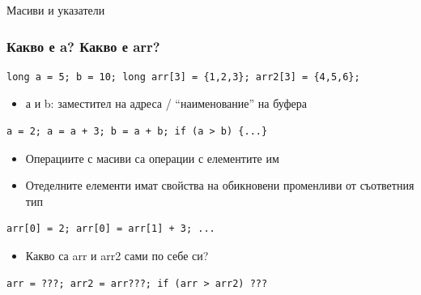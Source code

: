 \documentclass{beamer}
\begin{document}
\begin{frame}
\centerline{Масиви и указатели}
\end{frame}


\begin{frame}[fragile]
\frametitle{Какво е a? Какво е arr?}

\begin{flushleft}
\begin{lstlisting}
long a = 5; b = 10; long arr[3] = {1,2,3}; arr2[3] = {4,5,6};
\end{lstlisting}
\end{flushleft}

\pause

\begin{itemize}
  \item а  и  b: заместител на адреса / ``наименование'' на буфера
\end{itemize}

\begin{flushleft}
\begin{lstlisting}
a = 2; a = a + 3; b = a + b; if (a > b) {...}
\end{lstlisting}
\end{flushleft}

\pause

\begin{itemize}
  \item Операциите с масиви са операции с елементите им
  \item Отеделните елементи имат свойства на обикновени променливи от съответния тип
\end{itemize}

\begin{flushleft}
\begin{lstlisting}
arr[0] = 2; arr[0] = arr[1] + 3; ...
\end{lstlisting}
\end{flushleft}

\pause

\begin{itemize}
  \item Какво са arr и arr2 сами по себе си?
\end{itemize}


\begin{flushleft}
\begin{lstlisting}
arr = ???; arr2 = arr???; if (arr > arr2) ???
\end{lstlisting}
\end{flushleft}

\end{frame}
\end{document}
